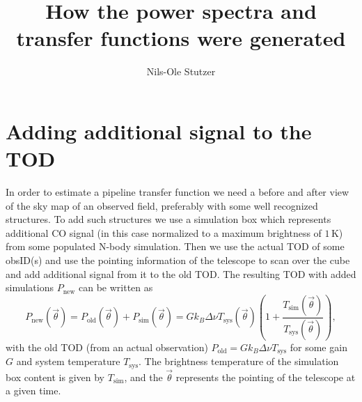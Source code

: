 \documentclass{aastex62}
\begin{document}
\title{How the power spectra and transfer functions were generated}

\author{Nils-Ole Stutzer}
\section*{Adding additional signal to the TOD}
In order to estimate a pipeline transfer function we need a before and after view of the sky map of an observed field, preferably with some well recognized structures. To add such structures we use a simulation box which represents additional CO signal (in this case normalized to a maximum brightness of $1\,\mathrm{K}$) from some populated N-body simulation. Then we use the actual TOD of some obsID(s) and use the pointing information of the telescope to scan over the cube and add additional signal from it to the old TOD. The resulting TOD with added simulations $P_\mathrm{new}$ can be written as 
\begin{equation}
    P_\mathrm{new}(\vec{\theta}) = P_\mathrm{old}(\vec{\theta}) + P_\mathrm{sim}(\vec{\theta}) = G k_B \Delta \nu T_\mathrm{sys}(\vec{\theta}) \left(1 + \frac{T_\mathrm{sim}(\vec{\theta})}{T_\mathrm{sys}(\vec{\theta})}\right),\label{eq:TODnew}
\end{equation}
with the old TOD (from an actual observation) $P_\mathrm{old} = G k_B \Delta \nu T_\mathrm{sys}$ for some gain $G$ and system temperature $T_\mathrm{sys}$. The brightness temperature of the simulation box content is given by $T_\mathrm{sim}$, and the $\vec{\theta}$ represents the pointing of the telescope at a given time.
\end{document}
